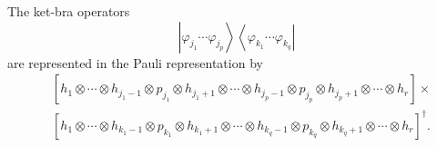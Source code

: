 \documentclass[aps,preprint]{revtex4}%
\begin{document}
The ket-bra operators
\begin{equation}
\left\vert \varphi_{j_{1}}\cdots\varphi_{j_{p}}\right\rangle \left\langle
\varphi_{k_{1}}\cdots\varphi_{k_{q}}\right\vert
\end{equation}
are represented in the Pauli representation by
\begin{align}
&  \left[  h_{1}\otimes\cdots\otimes h_{j_{1}-1}\otimes p_{j_{1}}\otimes
h_{j_{1}+1}\otimes\cdots\otimes h_{j_{p}-1}\otimes p_{j_{p}}\otimes
h_{j_{p}+1}\otimes\cdots\otimes h_{r}\right]  \times\nonumber\\
&  \left[  h_{1}\otimes\cdots\otimes h_{k_{1}-1}\otimes p_{k_{1}}\otimes
h_{k_{1}+1}\otimes\cdots\otimes h_{k_{q}-1}\otimes p_{k_{q}}\otimes
h_{k_{q}+1}\otimes\cdots\otimes h_{r}\right]  ^{\dagger}.
\end{align}
\end{document}
